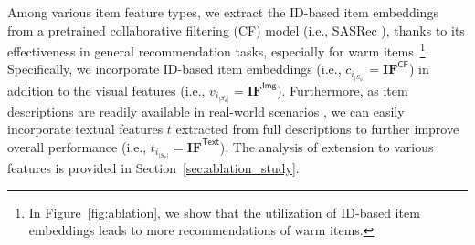 \documentclass[sigconf]{acmart}
\begin{document}
Among various item feature types, we extract the ID-based item embeddings from a pretrained collaborative filtering (CF) model (i.e., SASRec \cite{kang2018self}), thanks to its effectiveness in general recommendation tasks, especially for warm items~\cite{kim2024large}\footnote{In Figure~\ref{fig:ablation}, we show that the utilization of ID-based item embeddings leads to more recommendations of warm items.}. 
Specifically, we incorporate ID-based item embeddings (i.e., $c_{i_{|S_u|}}=\mathbf{IF}^{\textsf{CF}}$) in addition to the visual features (i.e., $v_{i_{|S_u|}}=\mathbf{IF}^{\textsf{Img}}$). 
Furthermore, as item descriptions are readily available in real-world scenarios \cite{zheng2024harnessing}, we can easily incorporate textual features $t$ extracted from full descriptions to further improve overall performance (i.e., $t_{i_{|S_u|}}=\mathbf{IF}^{\textsf{Text}}$). 
The analysis of extension to various features is provided in Section~\ref{sec:ablation_study}.
\end{document}
